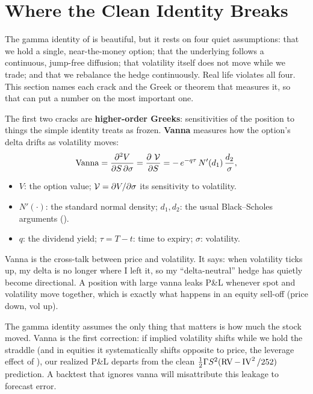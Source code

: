 \section{Where the Clean Identity Breaks}
\label{sec:ivrv:breaks}

The gamma identity of  is beautiful, but it rests on four quiet assumptions: that we hold a single, near-the-money option; that the underlying follows a continuous, jump-free diffusion; that volatility itself does not move while we trade; and that we rebalance the hedge continuously. Real life violates all four. This section names each crack and the Greek or theorem that measures it, so that  can put a number on the most important one.

The first two cracks are \textbf{higher-order Greeks}: sensitivities of the position to things the simple identity treats as frozen. \textbf{Vanna} measures how the option's delta drifts as volatility moves:
\begin{equation}
\label{eq:ivrv:vanna}
\operatorname{Vanna} = \frac{\partial^2 V}{\partial S\,\partial \sigma} = \frac{\partial\, \operatorname{\mathcal{V}}}{\partial S} = -\,e^{-q\tau}\,N'(d_1)\,\frac{d_2}{\sigma},
\end{equation}
\begin{itemize}
  \item $V$: the option value; $\operatorname{\mathcal{V}} = \partial V/\partial\sigma$ its sensitivity to volatility.
  \item $N'(\cdot)$: the standard normal density; $d_1, d_2$: the usual Black--Scholes arguments ().
  \item $q$: the dividend yield; $\tau = T-t$: time to expiry; $\sigma$: volatility.
\end{itemize}

\begin{intuition}
Vanna is the cross-talk between price and volatility. It says: when volatility ticks up, my delta is no longer where I left it, so my ``delta-neutral'' hedge has quietly become directional. A position with large vanna leaks P\&L whenever spot and volatility move together, which is exactly what happens in an equity sell-off (price down, vol up).
\end{intuition}

\begin{projectconnection}
The gamma identity assumes the only thing that matters is how much the stock moved. Vanna is the first correction: if implied volatility shifts while we hold the straddle (and in equities it systematically shifts opposite to price, the leverage effect of ), our realized P\&L departs from the clean $\tfrac12\Gamma S^2(\operatorname{RV} - \operatorname{IV}^2/252)$ prediction. A backtest that ignores vanna will misattribute this leakage to forecast error.
\end{projectconnection}

